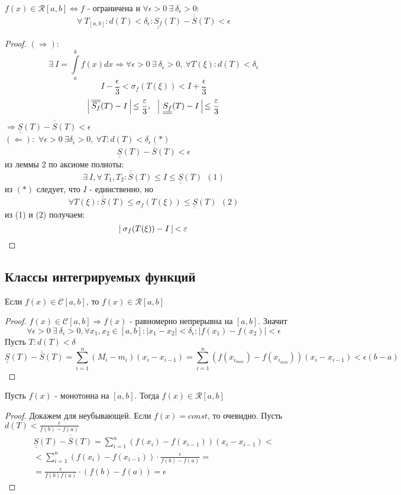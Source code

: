 \begin{theorem}
    $f(x)\in \mathcal{R}[a,b] \Leftrightarrow f$ - ограничена и $\forall \epsilon>0\ \exists\ \delta_{\epsilon}>0:$
    \[\forall\ T_{[a,b]}: d(T)<\delta_{\epsilon}: \underline{\underline{S_f}}(T)-\overline{\overline{S}}(T)<\epsilon\]
\end{theorem} 
\begin{proof}
    $(\Rightarrow):$
    \[\exists\ I=\int\limits_{a}^{b}f(x)dx \Rightarrow \forall \epsilon>0\ \exists\ \delta_{\epsilon}>0,\ \forall T(\xi): d(T)<\delta_{\epsilon}\]
    \[I-\frac{\epsilon}{3}<\sigma_f(T(\xi))<I+\frac{\epsilon}{3}\]
    \[\vline\ \overline{\overline{S_f}}(T)-I\ \vline \leq \frac{\epsilon}{3},\ \ \  \vline\ \underline{\underline{S_f}}(T)-I\ \vline \leq \frac{\epsilon}{3}\]
    $\Rightarrow \underline{\underline{S}}(T)-\overline{\overline{S}}(T)<\epsilon$\\
    $(\Leftarrow):$
    $\forall \epsilon>0\ \exists \delta_{\epsilon}>0,\ \forall T: d(T)<\delta_{\epsilon} (*)$
    \[\underline{\underline{S}}(T)-\overline{\overline{S}}(T)<\epsilon\]
    из леммы 2 по аксиоме полноты: 
    \[\exists\ I, \forall\ T_1, T_2: \overline{\overline{S}}(T)\leq I\leq\underline{\underline{S}}(T)\ \ (1)\]
    из $(*)$ следует, что $I$ - единственно, но 
    \[\forall T(\xi): \overline{\overline{S}}(T)\leq \sigma_f(T(\xi))\leq \underline{\underline{S}}(T)\ \ (2)\]
    из (1) и (2) получаем:
    \[\vline\ \sigma_f(T(\xi))-I \ \vline<\epsilon\]
\end{proof} 
\subsection{Классы интегрируемых функций}
\begin{theorem}
    Если $f(x)\in \mathcal{C}[a,b]$, то $f(x)\in \mathcal{R}[a,b]$
\end{theorem} 
\begin{proof}
    $f(x)\in \mathcal{C}[a,b] \Rightarrow f(x)$ - равномерно непрерывна на $[a,b]$. Значит 
    \[\forall \epsilon>0\ \exists\ \delta_{\epsilon}>0, \forall x_1, x_2\in [a,b]: |x_1-x_2|<\delta_{\epsilon}: |f(x_1)-f(x_2)|<\epsilon\]
    Пусть $T: d(T)<\delta$
    \[\underline{\underline{S}}(T)-\overline{\overline{S}}(T)=\sum\limits_{i=1}^{n}(M_i-m_i)(x_i-x_{i-1})=\sum\limits_{i=1}^{n}(f(x_{i_{max}})-f(x_{i_{min}}))(x_i-x_{i-1})<\epsilon(b-a)\]
\end{proof} 
\begin{theorem}
    Пусть $f(x)$ - монотонна на $[a,b]$. Тогда $f(x)\in \mathcal{R}[a,b]$
\end{theorem} 
\begin{proof}
    Докажем для неубывающей. Если $f(x)=const$, то очевидно.
    Пусть $d(T)<\frac{\epsilon}{f(b)-f(a)}$
    \begin{multline*}
        \underline{\underline{S}}(T)-\overline{\overline{S}}(T)=\sum\limits_{i=1}^{n}(f(x_i)-f(x_{i-1}))(x_i-x_{i-1})<\\
        <\sum\limits_{i=1}^{n}(f(x_i)-f(x_{i-1}))\cdot \frac{\epsilon}{f(b)-f(a)}=\\
        =\frac{\epsilon}{f(b)f(a)}\cdot (f(b)-f(a))=\epsilon
    \end{multline*}
\end{proof} 
